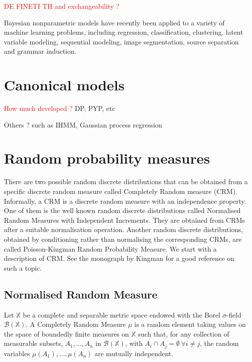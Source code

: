 \textcolor{red}{DE FINETI TH and exchangeability ?}


Bayesian nonparametric models have recently been applied to a variety of machine learning problems, including regression, classification, clustering, latent variable modeling, sequential modeling, image segmentation, source separation and grammar induction.

\section{Canonical models}
\textcolor{red}{How much developed ?}
DP, PYP, etc

Others ? such as IHMM, Gaussian process regression

\section{Random probability measures}
There are two possible random discrete distributions that can be obtained from a specific discrete random measure called Completely Random measure (CRM). Informally, a \gls{CRM} is a discrete random measure with an independence property. One of them is the well known random discrete distributions called Normalised Random Measures with Independent Increments. They are obtained from \gls{CRM}s after a suitable normalisation operation. Another random discrete distributions, obtained by conditioning rather than normalising the corresponding \gls{CRM}s, are called Poisson-Kingman Random Probability Measure.
We start with a description of \gls{CRM}.
See the monograph by Kingman \cite{kingman-poisson-processes} for a good reference on such a topic.

\subsection{Normalised Random Measure}

\begin{definition} \label{def:CRM}
Let $\mathbb{X}$ be a complete and separable metric space endowed with the Borel $\sigma$-field $\mathcal{B}(\mathbb{X})$. A Completely Random Measure $\mu$ is a random element taking values on the space of boundedly finite measures on $\mathbb{X}$ such that, for any collection of measurable subsets, $A_1, \dots , A_n$ in $\mathcal{B}(\mathbb{X})$, with $A_i \cap  A_j = \emptyset \ \forall i \neq j$, the random variables $\mu(A_1), \dots, \mu(A_n)$ are mutually independent.
\end{definition}

